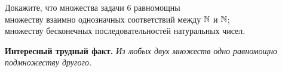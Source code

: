 \documentclass[a4paper,12pt]{article}
\begin{document}

Докажите, что множества задачи 6 равномощны \\
множеству взаимно однозначных соответствий между $\mathbb{N}$ и $\mathbb{N}$; \\
множеству бесконечных последовательностей %
натуральных чисел.

\smallskip
\noindent
{\bf Интересный трудный факт.}
{\em Из любых двух множеств одно равномощно подмножеству другого.}





\end{document}
